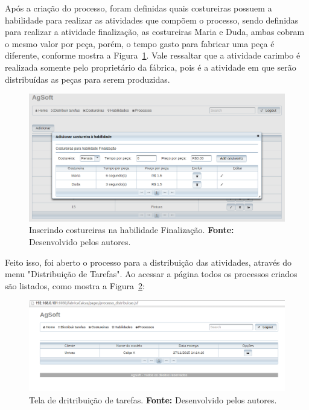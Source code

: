 \par Após a criação do processo, foram definidas quais costureiras possuem a
habilidade para realizar as atividades que compõem o processo, sendo definidas
para realizar a atividade finalização, as costureiras Maria e Duda, ambas cobram o 
mesmo valor por peça, porém, o tempo gasto para fabricar uma peça é diferente, 
conforme mostra a Figura~\ref{fig:costureira_habilidade}. Vale ressaltar que
a atividade carimbo é realizada somente pelo proprietário da fábrica, pois é a
atividade em que serão distribuídas as peças para serem produzidas. 


\begin{figure}[h!]
	\centerline{\includegraphics[width=14.7cm]{./imagens/tela_habilidade_teste1.png}}
	\caption[Inserindo costureiras na habilidade Finalização.]
	{Inserindo costureiras na habilidade Finalização. \textbf{Fonte:} Desenvolvido
	pelos autores.}
	\label{fig:costureira_habilidade}
\end{figure}


\par Feito isso, foi aberto o processo para a distribuição
das atividades, através do menu "Distribuição de Tarefas".
Ao acessar a página todos os processos criados são
listados, como mostra a Figura~\ref{fig:distribuicao_tarefas}:

\begin{figure}[h!]
	\centerline{\includegraphics[width=14.7cm]{./imagens/tela_distribuicao_tarefas.png}}
	\caption[Tela de distribuição de tarefas.]
	{Tela de dritribuição de tarefas. \textbf{Fonte:} Desenvolvido
	pelos autores.}
	\label{fig:distribuicao_tarefas}
\end{figure}



